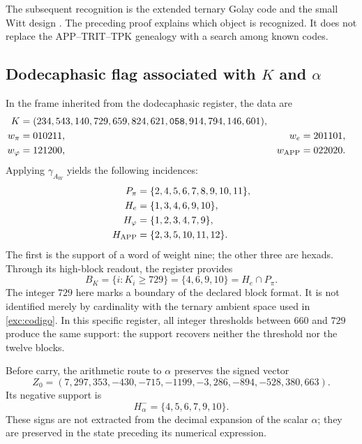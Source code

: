 The subsequent recognition is the extended ternary Golay code and
the small Witt design \cite{conwaysloane}. The preceding proof explains which object is
recognized. It does not replace the APP--TRIT--TPK genealogy with a search
among known codes.

\subsection{Dodecaphasic flag associated with \texorpdfstring{$K$ and $\alpha$}{K and alpha}}
\label{exc:bandera}



In the frame inherited from the dodecaphasic register, the data are
\begin{align}
 K={}&(234,543,140,729,659,824,621,\mathtt{058},914,794,146,601),
 \label{exc:k}\\
 w_\pi={}&010211, &w_e={}&201101,\nonumber\\
 w_\varphi={}&121200, &w_{\rm APP}={}&022020.\nonumber
\end{align}
Applying $\gamma_{A_W}$ yields the following incidences:
\begin{align*}
 P_\pi&=\{2,4,5,6,7,8,9,10,11\},\\
 H_e&=\{1,3,4,6,9,10\},\\
 H_\varphi&=\{1,2,3,4,7,9\},\\
 H_{\rm APP}&=\{2,3,5,10,11,12\}.
\end{align*}
The first is the support of a word of weight nine; the other three
are hexads. Through its high-block readout, the register provides
\begin{equation}
 B_K=\{i:K_i\geq729\}=\{4,6,9,10\}=H_e\cap P_\pi.
 \label{exc:bk}
\end{equation}
The integer $729$ here marks a boundary of the declared
block format. It is not identified merely by cardinality with the
ternary ambient space used in \eqref{exc:codigo}. In this specific register, all
integer thresholds between $660$ and $729$ produce the same support:
the support recovers neither the threshold nor the twelve blocks.

Before carry, the arithmetic route to $\alpha$ preserves the
signed vector
\begin{equation}
 Z_0=(7,297,353,-430,-715,-1199,-3,286,-894,-528,380,663).
 \label{exc:precarry}
\end{equation}
Its negative support is
\begin{equation}
 H^-_\alpha=\{4,5,6,7,9,10\}.
 \label{exc:halpha}
\end{equation}
These signs are not extracted from the decimal expansion of the scalar
$\alpha$; they are preserved in the state preceding its numerical expression.

